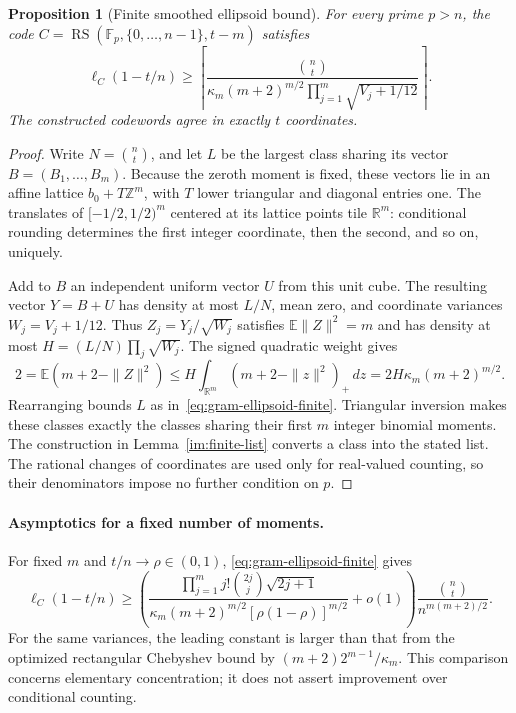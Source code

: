 \documentclass[11pt,letterpaper]{article}
\newtheorem{proposition}[theorem]{Proposition}
\theoremstyle{definition}
\theoremstyle{remark}
\newcommand{\F}{\mathbb F}
\newcommand{\RS}{\operatorname{RS}}
\begin{document}
\begin{proposition}[Finite smoothed ellipsoid bound]
\label{prop:gram-ellipsoid}
For every prime $p>n$, the code
$C=\RS(\F_p,\{0,\ldots,n-1\},t-m)$ satisfies
\begin{equation}\label{eq:gram-ellipsoid-finite}
 \ell_C(1-t/n)\ge
 \left\lceil\frac{\binom nt}
 {\kappa_m(m+2)^{m/2}\prod_{j=1}^m\sqrt{V_j+1/12}}\right\rceil.
\end{equation}
The constructed codewords agree in exactly $t$ coordinates.
\end{proposition}
\begin{proof}
Write $N=\binom nt$, and let $L$ be the largest class sharing its vector
$B=(B_1,\ldots,B_m)$. Because the zeroth moment is fixed, these vectors
lie in an affine lattice $b_0+T\mathbb Z^m$, with $T$ lower triangular
and diagonal entries one. The translates of $[-1/2,1/2)^m$ centered at
its lattice points tile $\mathbb R^m$: conditional rounding determines
the first integer coordinate, then the second, and so on, uniquely.

Add to $B$ an independent uniform vector $U$ from this unit cube.
The resulting vector $Y=B+U$ has density at most $L/N$, mean zero,
and coordinate variances $W_j=V_j+1/12$. Thus
$Z_j=Y_j/\sqrt{W_j}$ satisfies $\mathbb E\|Z\|^2=m$ and has density
at most $H=(L/N)\prod_j\sqrt{W_j}$. The signed quadratic weight gives
\[
 2=\mathbb E(m+2-\|Z\|^2)
 \le H\int_{\mathbb R^m}(m+2-\|z\|^2)_+\,dz
 =2H\kappa_m(m+2)^{m/2}.
\]
Rearranging bounds $L$ as in~\eqref{eq:gram-ellipsoid-finite}.
Triangular inversion makes these classes exactly the classes sharing
their first $m$ integer binomial moments. The construction in
Lemma~\ref{im:finite-list} converts a class into the stated list.
The rational changes of coordinates are used only for real-valued
counting, so their denominators impose no further condition on $p$.
\end{proof}

\paragraph{Asymptotics for a fixed number of moments.}
For fixed $m$ and $t/n\to\rho\in(0,1)$,
\eqref{eq:gram-ellipsoid-finite} gives
\begin{equation}\label{eq:gram-ellipsoid-asymptotic}
 \ell_C(1-t/n)\ge
 \left(
 \frac{\prod_{j=1}^m j!\binom{2j}{j}\sqrt{2j+1}}
 {\kappa_m(m+2)^{m/2}[\rho(1-\rho)]^{m/2}}+o(1)
 \right)\frac{\binom nt}{n^{m(m+2)/2}}.
\end{equation}
For the same variances, the leading constant is larger than that from
the optimized rectangular Chebyshev bound by
$(m+2)2^{m-1}/\kappa_m$. This comparison concerns elementary
concentration; it does not assert improvement over conditional counting.
\end{document}
